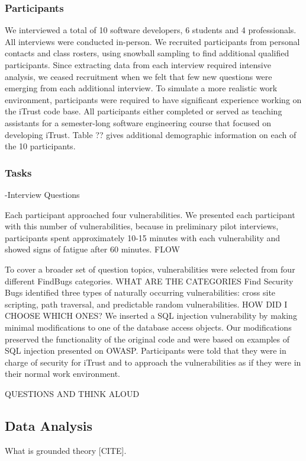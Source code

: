 \documentclass[conference]{IEEEtran}
\begin{document}
\subsubsection{Participants}
We interviewed a total of 10 software developers, 6 students and 4 professionals. 
All interviews were conducted in-person.
We recruited participants from personal contacts and class rosters, using snowball sampling to find additional qualified participants.
Since extracting data from each interview required intensive analysis, we ceased recruitment when we felt that few new questions were emerging from each additional interview.
To simulate a more realistic work environment, participants were required to have significant experience working on the iTrust code base. All participants either completed or served as teaching assistants for a semester-long software engineering course that focused on developing iTrust.
Table ?? gives additional demographic information on each of the 10 participants. 

\subsubsection{Tasks}
-Interview Questions

Each participant approached four vulnerabilities. We presented each participant with this number of vulnerabilities, because in preliminary pilot interviews, participants spent approximately 10-15 minutes with each vulnerability and showed signs of fatigue after 60 minutes.
FLOW

To cover a broader set of question topics, vulnerabilities were selected from four different FindBugs categories. WHAT ARE THE CATEGORIES 
Find Security Bugs identified three types of naturally occurring vulnerabilities: cross site scripting, path traversal, and predictable random vulnerabilities. HOW DID I CHOOSE WHICH ONES?
We inserted a SQL injection vulnerability by making minimal modifications to one of the database access objects. 
Our modifications preserved the functionality of the original code and were based on examples of SQL injection presented on OWASP.
Participants were told that they were in charge of security for iTrust and to approach the vulnerabilities as if they were in their normal work environment.

QUESTIONS AND THINK ALOUD

\subsection{Data Analysis}
\label{dataAnalysis}
What is grounded theory [CITE]. 
\end{document}
